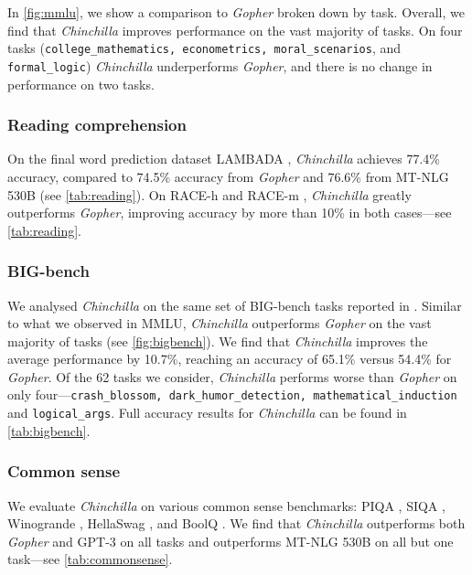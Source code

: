 In \autoref{fig:mmlu}, we show a comparison to \textit{Gopher} broken down by task. Overall, we find that \textit{Chinchilla} improves performance on the vast majority of tasks. On four tasks (\texttt{college\_mathematics, econometrics, moral\_scenarios}, and \texttt{formal\_logic}) \textit{Chinchilla} underperforms \textit{Gopher}, and there is no change in performance on two tasks.

\subsubsection{Reading comprehension} On the final word prediction dataset LAMBADA \citep{paperno2016lambada}, \textit{Chinchilla} achieves 77.4\% accuracy, compared to 74.5\% accuracy from \textit{Gopher} and 76.6\% from MT-NLG 530B (see \autoref{tab:reading}). 
On RACE-h and RACE-m \citep{race}, \textit{Chinchilla} greatly outperforms \textit{Gopher}, improving accuracy by more than 10\% in both cases---see \autoref{tab:reading}.

\subsubsection{BIG-bench}
We analysed \textit{Chinchilla} on the same set of BIG-bench tasks \citep{bigbench} reported in \citet{rae2021gopher}. 
Similar to what we observed in MMLU, \textit{Chinchilla} outperforms \textit{Gopher} on the vast majority of tasks (see \autoref{fig:bigbench}). 
We find that \textit{Chinchilla} improves the average performance by 10.7\%, reaching an accuracy of 65.1\% versus 54.4\% for \textit{Gopher}.
Of the 62 tasks we consider, \textit{Chinchilla} performs worse than \textit{Gopher} on only four---\texttt{crash\_blossom, dark\_humor\_detection, mathematical\_induction} and \texttt{logical\_args}. 
Full accuracy results for \textit{Chinchilla} can be found in \autoref{tab:bigbench}.

\subsubsection{Common sense}

We evaluate \textit{Chinchilla} on various common sense benchmarks: PIQA \citep{piqa}, SIQA \citep{socialiqa}, Winogrande \citep{winogrande}, HellaSwag \citep{hellaswag}, and BoolQ \citep{clark2019boolq}. We find that \textit{Chinchilla} outperforms both \textit{Gopher} and GPT-3 on all tasks and outperforms MT-NLG 530B on all but one task---see \autoref{tab:commonsense}. 

